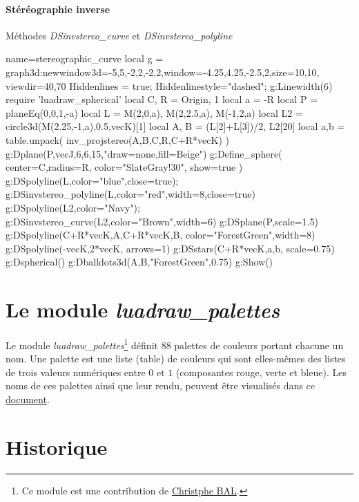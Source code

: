 \paragraph{Stéréographie inverse}

\begin{demo}{Méthodes \emph{DSinvstereo\_curve} et \emph{DSinvstereo\_polyline}}
\begin{luadraw}{name=stereographic_curve}
local g = graph3d:new{window3d={-5,5,-2,2,-2,2},window={-4.25,4.25,-2.5,2},size={10,10}, viewdir={40,70}}
Hiddenlines = true; Hiddenlinestyle="dashed"; g:Linewidth(6)
require 'luadraw_spherical'
local C, R = Origin, 1
local a = -R
local P = planeEq(0,0,1,-a)
local L = {M(2,0,a), M(2,2.5,a), M(-1,2,a)}
local L2 = circle3d(M(2.25,-1,a),0.5,vecK)[1]
local A, B = (L[2]+L[3])/2, L2[20]
local a,b = table.unpack( inv_projstereo({A,B},{C,R},C+R*vecK) )
g:Dplane(P,vecJ,6,6,15,"draw=none,fill=Beige")
g:Define_sphere( {center=C,radius=R, color="SlateGray!30", show=true} )
g:DSpolyline(L,{color="blue",close=true}); g:DSinvstereo_polyline(L,{color="red",width=8,close=true})
g:DSpolyline(L2,{color="Navy"}); g:DSinvstereo_curve(L2,{color="Brown",width=6})
g:DSplane(P,{scale=1.5})
g:DSpolyline({{C+R*vecK,A},{C+R*vecK,B}}, {color="ForestGreen",width=8})
g:DSpolyline({{-vecK,2*vecK}}, {arrows=1})
g:DSstars({C+R*vecK,a,b}, {scale=0.75})
g:Dspherical()
g:Dballdots3d({A,B},"ForestGreen",0.75)
g:Show()
\end{luadraw}
\end{demo}


\section{Le module \emph{luadraw\_palettes}}

Le module \emph{luadraw\_palettes}\footnote{Ce module est une contribution de \href{https://github.com/projetmbc/for-writing/tree/main/palcol}{Christphe BAL}.} définit $88$ palettes de couleurs portant chacune un nom. Une palette est une liste (table) de couleurs qui sont elles-mêmes des listes de trois valeurs numériques entre $0$ et $1$ (composantes rouge, verte et bleue). Les noms de ces palettes ainsi que leur rendu, peuvent être visualisés dans ce \href{luadraw_palettes_doc.pdf}{document}.

\section{Historique}

